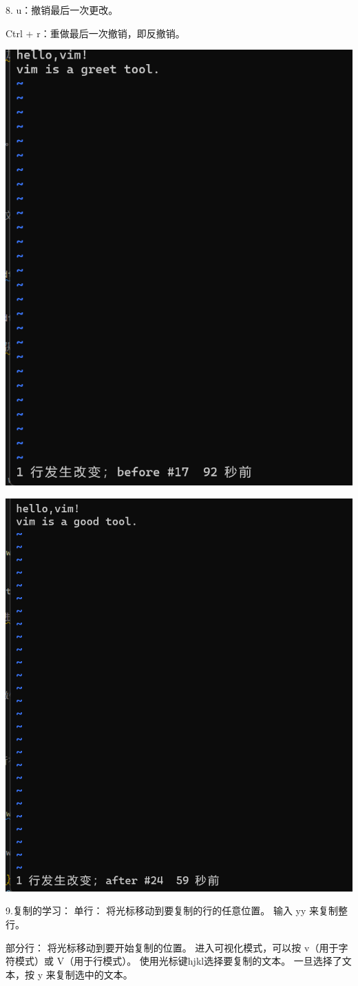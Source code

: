 \documentclass{article}
\begin{document}
8. 
u：撤销最后一次更改。

Ctrl + r：重做最后一次撤销，即反撤销。


\begin{minipage}{\linewidth}
    \centering
     \includegraphics[width=0.5\linewidth]{vim10.png}
     \label{fig:example}
\end{minipage}

\begin{minipage}{\linewidth}
  \centering
   \includegraphics[width=0.5\linewidth]{vim11.png}
   \label{fig:example}
\end{minipage}


9.复制的学习：
单行：
将光标移动到要复制的行的任意位置。
输入 yy 来复制整行。

部分行：
将光标移动到要开始复制的位置。
进入可视化模式，可以按 v（用于字符模式）或 V（用于行模式）。
使用光标键hjkl选择要复制的文本。
一旦选择了文本，按 y 来复制选中的文本。
\end{document}
